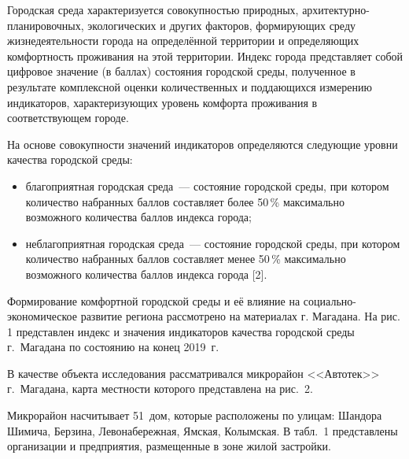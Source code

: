 Городская среда характеризуется совокупностью природных, ар\-хи\-тек\-тур\-но-планировочных, экологических и других факторов, формирующих среду жизнедеятельности города на определённой территории и определяющих комфортность проживания на этой территории. Индекс города представляет собой цифровое значение (в баллах) состояния городской среды, полученное в результате комплексной оценки количественных и поддающихся измерению индикаторов, характеризующих уровень комфорта проживания в соответствующем городе.

На основе совокупности значений индикаторов определяются следующие уровни качества городской среды:
\begin{itemize}[noitemsep]\vspace{-8pt}
  \item благоприятная городская среда~--- состояние городской среды, при котором количество набранных баллов составляет более 50\,\% максимально возможного количества баллов индекса города;
  \item неблагоприятная городская среда~--- состояние городской среды, при котором количество набранных баллов составляет менее 50\,\% максимально возможного количества баллов индекса города [2].
\end{itemize}
 \vspace{-8pt}
Формирование комфортной городской среды и её влияние на социально-экономическое развитие региона рассмотрено на материалах г. Магадана. На рис. 1 представлен индекс и значения индикаторов качества городской среды г.~Магадана по состоянию на конец 2019~г.



В качестве объекта исследования рассматривался микрорайон <<Автотек>> г.~Магадана, карта местности которого представлена на рис.~2.



Микрорайон насчитывает 51~дом, которые расположены по улицам: Шандора Шимича, Берзина, Левонабережная, Ямская, Колымская. В табл.~1 представлены организации и предприятия, размещенные в зоне жилой застройки.



